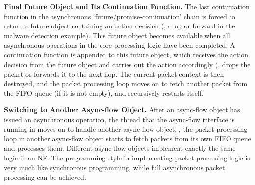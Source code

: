 \vspace{1mm}
\noindent\textbf{Final Future Object and Its Continuation Function.} The last continuation function in the asynchronous `future/promise-continuation' chain is forced to return a future object containing an action decision (\eg, drop or forward in the malware detection example). This future object becomes available when all asynchronous operations in the core processing logic have been completed. A continuation function is appended to this future object, which receives the action decision from the future object and carries out the action accordingly (\eg, drops the packet or forwards it to the next hop. The current packet context is then destroyed, and the packet processing loop moves on to fetch another packet from the FIFO queue (if it is not empty), and recursively restarts itself.


\vspace{1mm}
\noindent\textbf{Switching to Another Async-flow Object.} After an async-flow object has issued an asynchronous operation, the thread that the async-flow interface is running in moves on to handle another async-flow object, \ie, the packet processing loop in another async-flow object starts to fetch packets from its own FIFO queue and processes them. Different async-flow objects implement exactly the same logic in an NF. The programming style in implementing packet processing logic is very much like synchronous programming, while full asynchronous packet processing can be achieved. %








